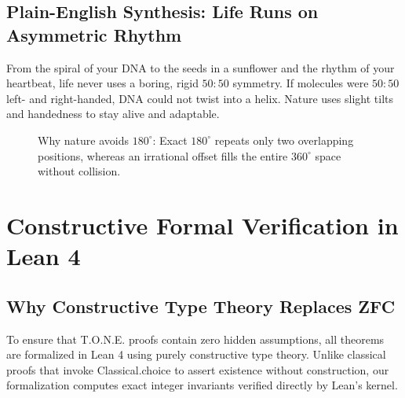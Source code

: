 \documentclass[11pt,a4paper,oneside]{article}
\def\texttt#1{#1}%
\theoremstyle{definition}
\begin{document}
\subsection{Plain-English Synthesis: Life Runs on Asymmetric Rhythm}
\begin{noobbox}
From the spiral of your DNA to the seeds in a sunflower and the rhythm of your heartbeat, life never uses a boring, rigid $50:50$ symmetry. If molecules were $50:50$ left- and right-handed, DNA could not twist into a helix. Nature uses slight tilts and handedness to stay alive and adaptable.
\end{noobbox}
\begin{figure}[h]
\centering
{}
\caption{Why nature avoids $180^\circ$: Exact $180^\circ$ repeats only two overlapping positions, whereas an irrational offset fills the entire $360^\circ$ space without collision.}
\end{figure}

\section{Constructive Formal Verification in Lean 4}
\subsection{Why Constructive Type Theory Replaces ZFC}
To ensure that T.O.N.E. proofs contain zero hidden assumptions, all theorems are formalized in Lean 4 using purely constructive type theory. Unlike classical proofs that invoke \texttt{Classical.choice} to assert existence without construction, our formalization computes exact integer invariants verified directly by Lean's kernel.
\end{document}
